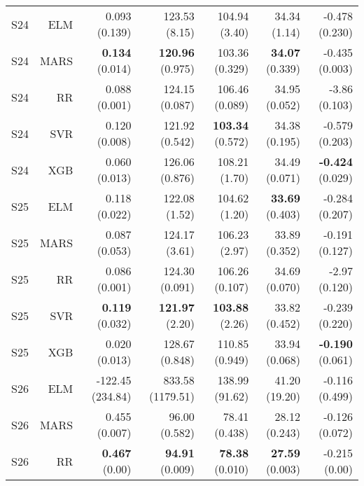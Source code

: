 \begin{table}
\begin{tabular}{rrrrrrr}
    S24 &       ELM &                       0.093 (0.139) &             123.53 (8.15) &           104.94 (3.40) &            34.34 (1.14) &        -0.478 (0.230) \\
    S24 &      MARS &                { \bf 0.134} (0.014) &     { \bf 120.96} (0.975) &          103.36 (0.329) &    { \bf 34.07} (0.339) &        -0.435 (0.003) \\
    S24 &        RR &                       0.088 (0.001) &            124.15 (0.087) &          106.46 (0.089) &           34.95 (0.052) &         -3.86 (0.103) \\
    S24 &       SVR &                       0.120 (0.008) &            121.92 (0.542) &   { \bf 103.34} (0.572) &           34.38 (0.195) &        -0.579 (0.203) \\
    S24 &       XGB &                       0.060 (0.013) &            126.06 (0.876) &           108.21 (1.70) &           34.49 (0.071) & { \bf -0.424} (0.029) \\
    S25 &       ELM &                       0.118 (0.022) &             122.08 (1.52) &           104.62 (1.20) &    { \bf 33.69} (0.403) &        -0.284 (0.207) \\
    S25 &      MARS &                       0.087 (0.053) &             124.17 (3.61) &           106.23 (2.97) &           33.89 (0.352) &        -0.191 (0.127) \\
    S25 &        RR &                       0.086 (0.001) &            124.30 (0.091) &          106.26 (0.107) &           34.69 (0.070) &         -2.97 (0.120) \\
    S25 &       SVR &                { \bf 0.119} (0.032) &      { \bf 121.97} (2.20) &    { \bf 103.88} (2.26) &           33.82 (0.452) &        -0.239 (0.220) \\
    S25 &       XGB &                       0.020 (0.013) &            128.67 (0.848) &          110.85 (0.949) &           33.94 (0.068) & { \bf -0.190} (0.061) \\
    S26 &       ELM &                    -122.45 (234.84) &          833.58 (1179.51) &          138.99 (91.62) &           41.20 (19.20) &        -0.116 (0.499) \\
    S26 &      MARS &                       0.455 (0.007) &             96.00 (0.582) &           78.41 (0.438) &           28.12 (0.243) &        -0.126 (0.072) \\
    S26 &        RR &                 { \bf 0.467} (0.00) &      { \bf 94.91} (0.009) &    { \bf 78.38} (0.010) &    { \bf 27.59} (0.003) &         -0.215 (0.00) \\

\end{tabular}
\end{table}
